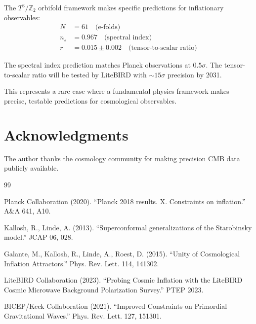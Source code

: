 \documentclass[12pt,a4paper]{article}
\begin{document}
The $T^3/\mathbb{Z}_2$ orbifold framework makes specific predictions for inflationary observables:
\begin{align}
N &= 61 \quad \text{(e-folds)} \\
n_s &= 0.967 \quad \text{(spectral index)} \\
r &= 0.015 \pm 0.002 \quad \text{(tensor-to-scalar ratio)}
\end{align}

The spectral index prediction matches Planck observations at $0.5\sigma$. The tensor-to-scalar ratio will be tested by LiteBIRD with $\sim15\sigma$ precision by 2031.

This represents a rare case where a fundamental physics framework makes precise, testable predictions for cosmological observables.

\section*{Acknowledgments}

The author thanks the cosmology community for making precision CMB data publicly available.

\begin{thebibliography}{99}

Planck Collaboration (2020). ``Planck 2018 results. X. Constraints on inflation.'' A\&A 641, A10.

Kallosh, R., Linde, A. (2013). ``Superconformal generalizations of the Starobinsky model.'' JCAP 06, 028.

Galante, M., Kallosh, R., Linde, A., Roest, D. (2015). ``Unity of Cosmological Inflation Attractors.'' Phys. Rev. Lett. 114, 141302.

LiteBIRD Collaboration (2023). ``Probing Cosmic Inflation with the LiteBIRD Cosmic Microwave Background Polarization Survey.'' PTEP 2023.

BICEP/Keck Collaboration (2021). ``Improved Constraints on Primordial Gravitational Waves.'' Phys. Rev. Lett. 127, 151301.

\end{thebibliography}
\end{document}
